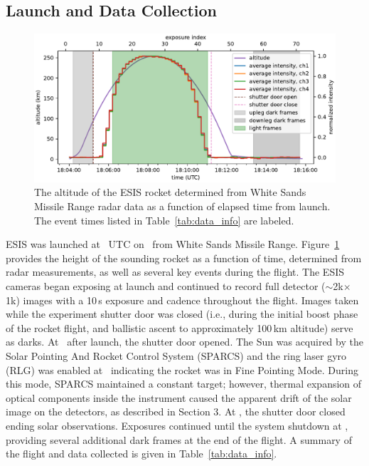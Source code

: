 \documentclass[linenumbers,trackchanges]{aastex63}
\begin{document}
	\subsection{Launch and Data Collection} 
		\begin{figure}
			\begin{center}
				\includegraphics{signal_and_altitude_vs_time}
				\caption{The altitude of the ESIS rocket determined from White Sands Missile Range radar data as a function of elapsed time from launch.  The event times listed in Table~\ref{tab:data_info} are labeled.
				}
				\label{fig:timeline}
			\end{center}
		\end{figure}

		ESIS was launched at \timeMissionStart~UTC
		on \dateMission\ from White Sands Missile Range.  Figure~\ref{fig:timeline} provides the height of the sounding rocket as a function of time, determined from radar measurements, as well as several key events during the flight.  
		The ESIS cameras began exposing at launch and continued to record full detector ($\sim$2k$\times$1k) images with a 10\,s exposure and cadence throughout the flight. Images taken while the
		experiment shutter door was closed (i.e., during the initial  boost phase of the rocket flight, and ballistic ascent to approximately 100\,km altitude) serve as darks.  
		At \timeMissionShutterOpen\ after launch, the shutter door opened.  
		The Sun was acquired by the Solar Pointing And Rocket Control System (SPARCS) and the ring laser gyro (RLG) was enabled at \timeMissionRlgEnable\ indicating the rocket was in Fine Pointing Mode.  
		During this mode, SPARCS maintained a constant target; however, thermal expansion of optical components inside the instrument caused the apparent drift of the solar image on the detectors, as described in Section 3.  
		At  \timeMissionShutterClose, the shutter door closed ending solar observations. Exposures continued until the system shutdown at \timeDataStop, providing several additional dark frames at the end of the flight.   A summary of the flight and data collected is given in Table~\ref{tab:data_info}.
		
\end{document}
